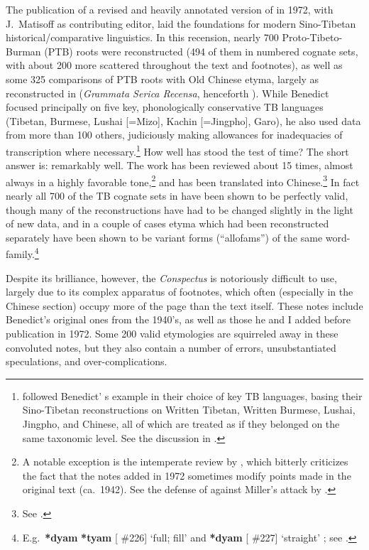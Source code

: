 The publication of a revised and heavily annotated version of \textit{} in 1972, 
with J.\ Matisoff as contributing editor, laid the foundations for modern Sino-Tibetan 
historical/\allowbreak{}comparative linguistics. In this recension, nearly 700 Proto-Tibeto-Burman 
(PTB) roots were reconstructed (494 of them in numbered cognate sets, with about 200 more 
scattered throughout the text and footnotes), as well as some 325 comparisons of PTB roots with 
Old Chinese etyma, largely as reconstructed in \citealt{GSR} (\textit{Grammata Serica Recensa},
henceforth \textit{}). While Benedict focused principally on 
five key, phonologically conservative TB languages (Tibetan, Burmese, Lushai [=Mizo], Kachin 
[=Jingpho], Garo), he also used data from more than 100 others, judiciously making allowances for 
inadequacies of transcription where necessary.\footnote{\citet{PS-STL}
followed Benedict’ s example in their choice of key TB languages, basing their Sino-Tibetan 
reconstructions on Written Tibetan, Written Burmese, Lushai, Jingpho, and Chinese, all of which 
are treated as if they belonged on the same taxonomic level. See the discussion in \citet[Ch.\ 
3]{ZH-OCST98}.} How well has \textit{} stood the test of time? The short answer 
is: remarkably well. The work has been reviewed about 15 times, almost always in a highly 
favorable tone,\footnote{A notable exception is the intemperate review by \citet{RAM-STIC}, which 
bitterly criticizes the fact that the notes added in 1972 sometimes modify points made in the 
original text (ca.\ 1942). See the defense of \textit{\citetalias{STC}} against Miller’s attack by 
\citet{JAM-BST}.} and has been translated into Chinese.\footnote{See \citealt{HZYG}.} In fact 
nearly all 700 of the TB cognate sets in \textit{\citetalias{STC}} have been shown to be perfectly 
valid, though many of the reconstructions have had to be changed slightly in the light of new 
data, and in a couple of cases etyma which had been reconstructed separately have been shown to be 
variant forms (“allofams”) of the same word-family.\footnote{E.g.\ \textbf{*dyam} \STEDTU{⪤} 
\textbf{*tyam} [\textit{} $\#$226] ‘full; fill’ and \textbf{*dyam} 
[\textit{\citetalias{STC}} $\#$227] ‘straight’ ; see \citet{JAM-USAI}.}

Despite its brilliance, however, the {\it Conspectus} is notoriously difficult to use, largely due to its complex apparatus of footnotes, which often (especially in the Chinese section) occupy more of the page than the text itself. These notes include Benedict’s original ones from the 1940’s, as well as those he and I added before publication in 1972. Some 200 valid etymologies are squirreled away in these convoluted notes, but they also contain a number of errors, unsubstantiated speculations, and over-complications.

